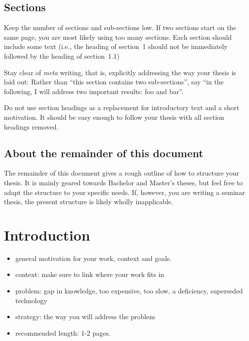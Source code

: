 \documentclass[]{nsm-thesis}
\begin{document}
\section{Sections}

Keep the number of sections and sub-sections low.
If two sections start on the same page, you are most likely using too many sections.
Each section should include some text (i.e., the heading of section~1 should not be immediately followed by the heading of section~1.1)

Stay clear of \emph{meta} writing, that is, explicitly addressing the way your thesis is laid out:
Rather than \enquote{this section contains two sub-sections}, say \enquote{in the following, I will address two important results: foo and bar}.

Do not use section headings as a replacement for introductory text and a short motivation.
It should be easy enough to follow your thesis with all section headings removed.


\section{About the remainder of this document}

The remainder of this document gives a rough outline of how to structure your thesis.
It is mainly geared towards Bachelor and Master's theses, but feel free to adapt the structure to your specific needs.
If, however, you are writing a seminar thesis, the present structure is likely wholly inapplicable.


\chapter{Introduction}
\label{sec:introduction}

\begin{itemize}
\item general motivation for your work, context and goals.
\item context: make sure to link where your work fits in
\item problem: gap in knowledge, too expensive, too slow, a deficiency, superseded technology
\item strategy: the way you will address the problem
\item recommended length: 1-2 pages.
\end{itemize}
\end{document}
